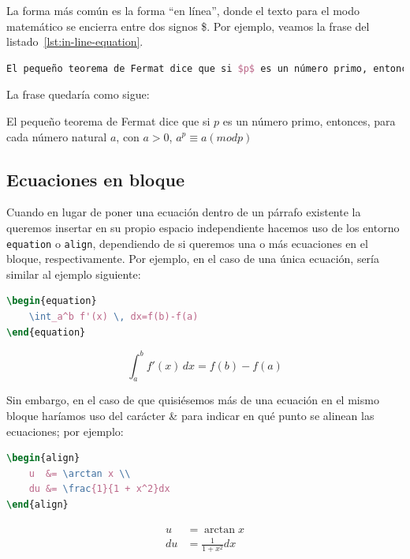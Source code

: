 La forma más común es la forma ``en línea'', donde el texto para el modo matemático se encierra entre dos signos \$. Por ejemplo, veamos la frase del listado~\ref{lst:in-line-equation}.

\begin{lstlisting}[language=tex,caption=Ejemplo de inserción de fórmulas en linea,label=lst:in-line-equation]
El pequeño teorema de Fermat dice que si $p$ es un número primo, entonces, para cada número natural $a$, con $a>0$, $a^p \equiv a (\mod p)$
\end{lstlisting}

La frase quedaría como sigue:

El pequeño teorema de Fermat dice que si $p$ es un número primo, entonces, para cada número natural $a$, con $a>0$, $a^p \equiv a (mod p)$

\subsection{Ecuaciones en bloque}

Cuando en lugar de poner una ecuación dentro de un párrafo existente la queremos insertar en su propio espacio independiente hacemos uso de los entorno \texttt{equation} o \texttt{align}, dependiendo de si queremos una o más ecuaciones en el bloque, respectivamente. Por ejemplo, en el caso de una única ecuación, sería similar al ejemplo siguiente:

\begin{minipage}[c]{.5\textwidth}
\begin{lstlisting}[language=tex]
\begin{equation}
	\int_a^b f'(x) \, dx=f(b)-f(a)
\end{equation}
\end{lstlisting}
\end{minipage}%
\begin{minipage}[c]{.5\textwidth}
\begin{equation}
    \int_a^b f'(x) \, dx=f(b)-f(a)
\end{equation}
\end{minipage}

Sin embargo, en el caso de que quisiésemos más de una ecuación en el mismo bloque haríamos uso del carácter \& para indicar en qué punto se alinean las ecuaciones; por ejemplo:

\begin{minipage}[t]{.5\textwidth}
\begin{lstlisting}[language=tex]
\begin{align}
    u  &= \arctan x \\ 
    du &= \frac{1}{1 + x^2}dx
\end{align}
\end{lstlisting}
\end{minipage}%
\begin{minipage}[h]{.5\textwidth}
\begin{align}
    u  &= \arctan x \\ 
    du &= \frac{1}{1 + x^2}dx
\end{align}
\end{minipage}

